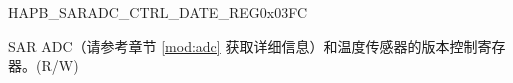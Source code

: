 \begin{register}{H}{APB\_SARADC\_CTRL\_DATE\_REG}{0x03FC}\label{regdesc:APBSARADCCTRLDATEREG}
%
\regnewline%
\begin{regdesc}\begin{reglist}
\label{fielddesc:APBSARADCDATE}\item [APB\_SARADC\_DATE] SAR ADC（请参考章节 \ref{mod:adc} \textit{} 获取详细信息）和温度传感器的版本控制寄存器。(R/W)
\end{reglist}\end{regdesc}
\end{register}
